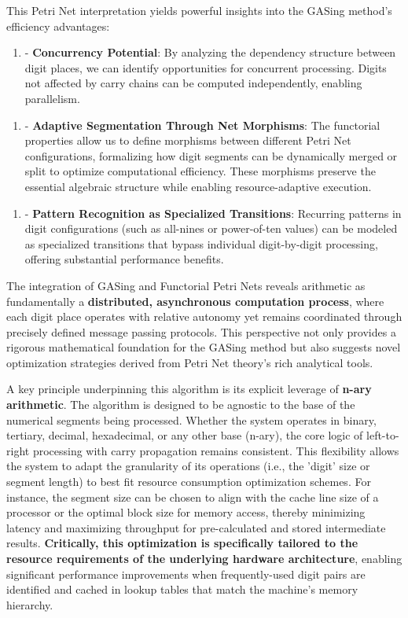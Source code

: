 This Petri Net interpretation yields powerful insights into the GASing method's efficiency advantages:

\begin{enumerate}
  \item - \textbf{Concurrency Potential}: By analyzing the dependency structure between digit places, we can identify opportunities for concurrent processing. Digits not affected by carry chains can be computed independently, enabling parallelism.
\end{enumerate}

\begin{enumerate}
  \item - \textbf{Adaptive Segmentation Through Net Morphisms}: The functorial properties allow us to define morphisms between different Petri Net configurations, formalizing how digit segments can be dynamically merged or split to optimize computational efficiency. These morphisms preserve the essential algebraic structure while enabling resource-adaptive execution.
\end{enumerate}

\begin{enumerate}
  \item - \textbf{Pattern Recognition as Specialized Transitions}: Recurring patterns in digit configurations (such as all-nines or power-of-ten values) can be modeled as specialized transitions that bypass individual digit-by-digit processing, offering substantial performance benefits.
\end{enumerate}

The integration of GASing and Functorial Petri Nets reveals arithmetic as fundamentally a \textbf{distributed, asynchronous computation process}, where each digit place operates with relative autonomy yet remains coordinated through precisely defined message passing protocols. This perspective not only provides a rigorous mathematical foundation for the GASing method but also suggests novel optimization strategies derived from Petri Net theory's rich analytical tools.

A key principle underpinning this algorithm is its explicit leverage of \textbf{n-ary arithmetic}. The algorithm is designed to be agnostic to the base of the numerical segments being processed. Whether the system operates in binary, tertiary, decimal, hexadecimal, or any other base (n-ary), the core logic of left-to-right processing with carry propagation remains consistent. This flexibility allows the system to adapt the granularity of its operations (i.e., the 'digit' size or segment length) to best fit resource consumption optimization schemes. For instance, the segment size can be chosen to align with the cache line size of a processor or the optimal block size for memory access, thereby minimizing latency and maximizing throughput for pre-calculated and stored intermediate results. \textbf{Critically, this optimization is specifically tailored to the resource requirements of the underlying hardware architecture}, enabling significant performance improvements when frequently-used digit pairs are identified and cached in lookup tables that match the machine's memory hierarchy.

